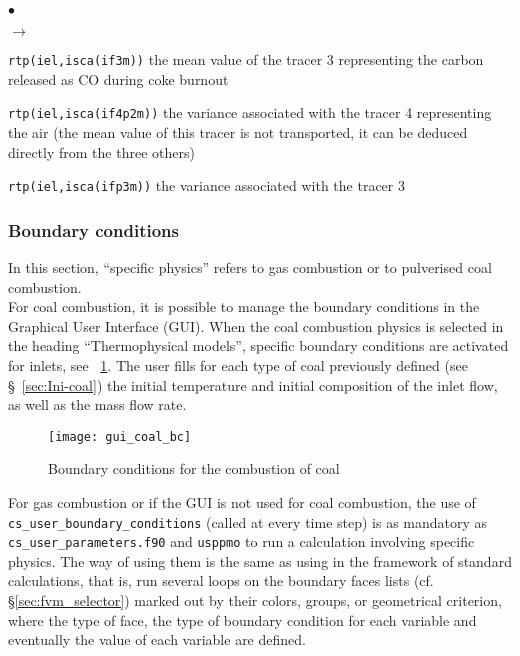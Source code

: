 {{\begin{list}{$\bullet$}{}
\begin{list}{$\rightarrow$}{}
\begin{list}{}{}
                                  \item \texttt{rtp(iel,isca(if3m))}
                                        the mean value of the tracer 3
                                        representing the carbon released
                                        as CO during coke burnout
                                  \item \texttt{rtp(iel,isca(if4p2m))} the variance associated with the tracer 4 representing the air (the mean value of this tracer is not transported, it can be deduced directly from the three others)
                                  \item \texttt{rtp(iel,isca(ifp3m))} the variance associated with the tracer 3
                           \end{list}
              \end{list}
\end{list}

\subsubsection{Boundary conditions}\label{sec:coal-cl}
In this section, ``specific physics'' refers to gas combustion or
to pulverised coal combustion.\\
For coal combustion, it is possible to manage the boundary conditions in the Graphical User Interface (GUI). When the coal combustion physics is selected in the heading ``Thermophysical models'', specific boundary conditions are activated for inlets, see \figurename~\ref{fig:cond_lim-coal}. The user fills for each type of coal previously defined (see \S~\ref{sec:Ini-coal}) the initial temperature and initial composition of the inlet flow, as well as the mass flow rate.

\begin{figure}[!ht]
\begin{center}
\texttt{[image: gui\_coal\_bc]}
\caption{Boundary conditions for the combustion of coal}
\label{fig:cond_lim-coal}
\end{center}
\end{figure}

For gas combustion or if the GUI is not used for coal combustion, the use of
\texttt{cs\_user\_boundary\_conditions} (called at every time step) is as
mandatory as \texttt{cs\_user\_parameters.f90} and \texttt{usppmo} to run a calculation involving specific physics. The way of using them is the same as using
 in the framework of standard calculations, that is, run several loops on the boundary faces lists (cf. \S\ref{sec:fvm_selector})
marked out by their colors, groups, or  geometrical criterion, where
the type of face, the type of boundary condition for each variable and
eventually the value of each variable are defined.

}}
